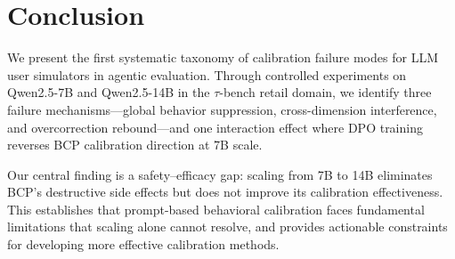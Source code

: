 \documentclass[11pt]{article}
\newcommand{\taubench}{$\tau$-bench}
\begin{document}
\section{Conclusion}

We present the first systematic taxonomy of calibration failure modes for LLM user simulators in agentic evaluation. Through controlled experiments on Qwen2.5-7B and Qwen2.5-14B in the \taubench{} retail domain, we identify three failure mechanisms---global behavior suppression, cross-dimension interference, and overcorrection rebound---and one interaction effect where DPO training reverses BCP calibration direction at 7B scale.

Our central finding is a safety--efficacy gap: scaling from 7B to 14B eliminates BCP's destructive side effects but does not improve its calibration effectiveness. This establishes that prompt-based behavioral calibration faces fundamental limitations that scaling alone cannot resolve, and provides actionable constraints for developing more effective calibration methods.


\end{document}
